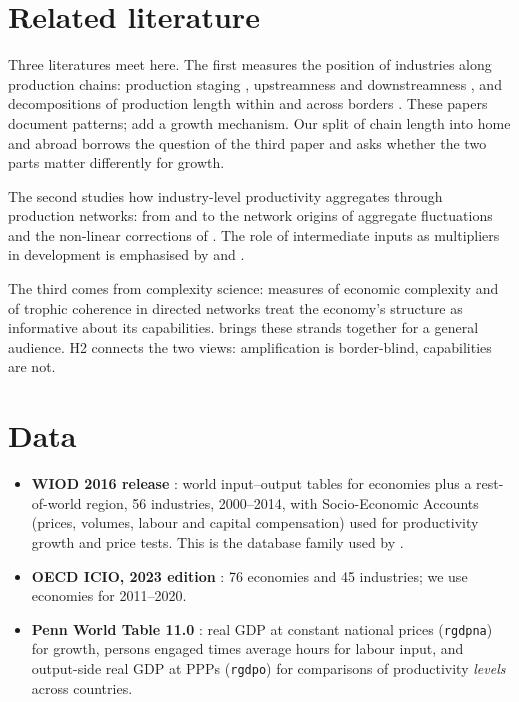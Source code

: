 \documentclass[11pt,a4paper]{article}
\begin{document}
\section{Related literature}\label{sec:lit}

Three literatures meet here. The first measures the position of industries along
production chains: production staging \citep{fally2012}, upstreamness and
downstreamness \citep{antras2012,miller2017}, and decompositions of production
length within and across borders \citep{wang2017}. These papers document
patterns; \citet{mcnerney2022} add a growth mechanism. Our split of chain length
into home and abroad borrows the question of the third paper and asks whether the
two parts matter differently for growth.

The second studies how industry-level productivity aggregates through production
networks: from \citet{domar1961} and \citet{hulten1978} to the network origins of
aggregate fluctuations \citep{acemoglu2012} and the non-linear corrections of
\citet{baqaee2019}. The role of intermediate inputs as multipliers in
development is emphasised by \citet{ciccone2002} and \citet{jones2011}.

The third comes from complexity science: measures of economic complexity
\citep{hidalgo2009} and of trophic coherence in directed networks
\citep{mackay2020} treat the economy's structure as informative about its
capabilities. \citet{farmer2024} brings these strands together for a general
audience. H2 connects the two views: amplification is border-blind, capabilities
are not.

\section{Data}\label{sec:data}

\begin{itemize}
\item \textbf{WIOD 2016 release} \citep{timmer2015,wiod2016}: world input--output
tables for \NWiod{} economies plus a rest-of-world region, 56 industries,
2000--2014, with Socio-Economic Accounts (prices, volumes, labour and capital
compensation) used for productivity growth and price tests. This is the database
family used by \citet{mcnerney2022}.
\item \textbf{OECD ICIO, 2023 edition} \citep{oecdicio2023}: 76 economies and 45
industries; we use \NIcio{} economies for 2011--2020.
\item \textbf{Penn World Table 11.0} \citep{feenstra2015,pwt110}: real GDP at
constant national prices (\texttt{rgdpna}) for growth, persons engaged times
average hours for labour input, and output-side real GDP at PPPs
(\texttt{rgdpo}) for comparisons of productivity \emph{levels} across countries.
\end{itemize}
\end{document}
